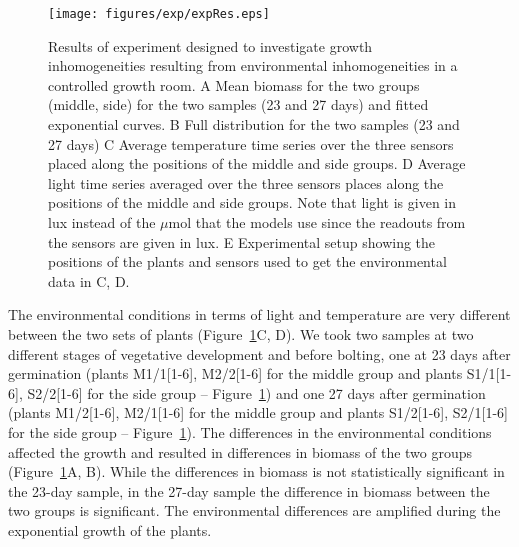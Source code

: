 
\begin{figure}[tb]
\centering
\texttt{[image: figures/exp/expRes.eps]}
\caption{ Results of experiment designed to investigate growth inhomogeneities
  resulting from environmental inhomogeneities in a controlled growth room. A
  Mean biomass for the two groups (middle, side) for the two samples (23 and 27
  days) and fitted exponential curves. B Full distribution for the two samples
  (23 and 27 days) C Average temperature time series over the three sensors
  placed along the positions of the middle and side groups. D Average light time
  series averaged over the three sensors places along the positions of the
  middle and side groups. Note that light is given in lux instead of the
  $\mu\mathrm{mol}$ that the models use since the readouts from the sensors are
  given in lux. E Experimental setup showing the positions of the plants and
  sensors used to get the environmental data in C, D.  }
\label{fig:expRes}
\end{figure}

The environmental conditions in terms of light and temperature are very
different between the two sets of plants (Figure~\ref{fig:expRes}C, D). We took
two samples at two different stages of vegetative development and before
bolting, one at 23 days after germination (plants M1/1[1-6], M2/2[1-6] for the
middle group and plants S1/1[1-6], S2/2[1-6] for the side group --
Figure~\ref{fig:expRes}) and one 27 days after germination (plants M1/2[1-6],
M2/1[1-6] for the middle group and plants S1/2[1-6], S2/1[1-6] for the side
group -- Figure~\ref{fig:expRes}). The differences in the environmental
conditions affected the growth and resulted in differences in biomass of the two
groups (Figure~\ref{fig:expRes}A, B). While the differences in biomass is not
statistically significant in the 23-day sample, in the 27-day sample the
difference in biomass between the two groups is significant. The environmental
differences are amplified during the exponential growth of the plants.


